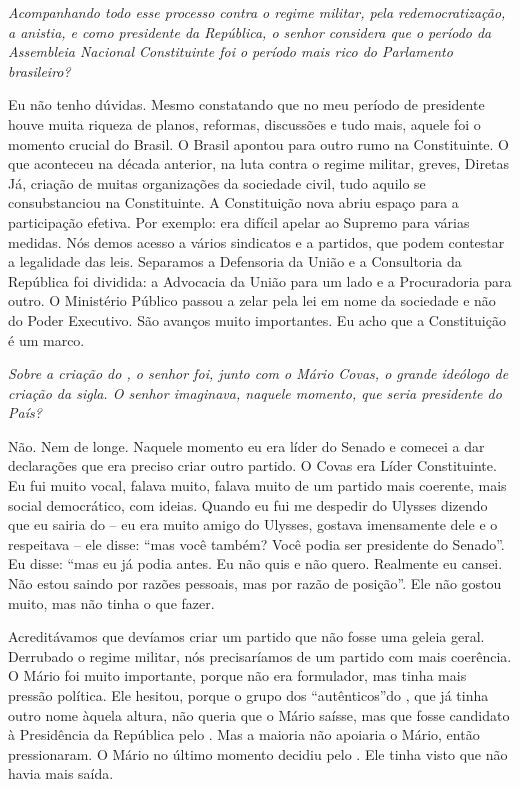 \medskip

\noindent\emph{Acompanhando todo esse processo contra o regime militar, pela
redemocratização, a anistia, e como presidente da República, o senhor
considera que o período da Assembleia Nacional Constituinte foi o
período mais rico do Parlamento brasileiro?}

Eu não tenho dúvidas. Mesmo constatando que no meu período
de presidente houve muita riqueza de planos, reformas, discussões e tudo
mais, aquele foi o momento crucial do Brasil. O Brasil apontou para
outro rumo na Constituinte. O que aconteceu na década anterior, na luta
contra o regime militar, greves, Diretas Já, criação de muitas
organizações da sociedade civil, tudo aquilo se consubstanciou na
Constituinte. A Constituição nova abriu espaço para a participação
efetiva. Por exemplo: era difícil apelar ao Supremo para várias medidas.
Nós demos acesso a vários sindicatos e a partidos, que podem contestar a
legalidade das leis. Separamos a Defensoria da União e a Consultoria da
República foi dividida: a Advocacia da União para um lado e a
Procuradoria para outro. O Ministério Público passou a zelar pela lei em
nome da sociedade e não do Poder Executivo. São avanços muito
importantes. Eu acho que a Constituição é um marco.

\medskip

\noindent\emph{Sobre a criação do , o senhor foi, junto com o Mário Covas,
o grande ideólogo de criação da sigla. O senhor imaginava, naquele
momento, que seria presidente do País?}

Não. Nem de longe. Naquele momento eu era líder do Senado
e comecei a dar declarações que era preciso criar outro partido. O Covas
era Líder Constituinte. Eu fui muito vocal, falava muito, falava muito
de um partido mais coerente, mais social democrático, com ideias. Quando
eu fui me despedir do Ulysses dizendo que eu sairia do  -- eu era
muito amigo do Ulysses, gostava imensamente dele e o respeitava -- ele
disse: ``mas você também? Você podia ser presidente do Senado''. Eu
disse: ``mas eu já podia antes. Eu não quis e não quero. Realmente eu
cansei. Não estou saindo por razões pessoais, mas por razão de
posição''. Ele não gostou muito, mas não tinha o que fazer.

Acreditávamos que devíamos criar um partido que não fosse uma geleia
geral. Derrubado o regime militar, nós precisaríamos de um partido com
mais coerência. O Mário foi muito importante, porque não era formulador,
mas tinha mais pressão política. Ele hesitou, porque o grupo dos
``autênticos''do , que já tinha outro nome àquela altura, não queria
que o Mário saísse, mas que fosse candidato à Presidência da República
pelo . Mas a maioria não apoiaria o Mário, então pressionaram. O
Mário no último momento decidiu pelo . Ele tinha visto que não havia
mais saída.

